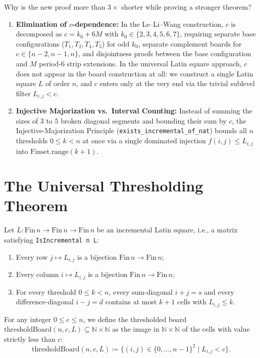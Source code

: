 \documentclass[11pt,a4paper]{article}
\theoremstyle{remark}
\begin{document}
Why is the new proof more than $3\times$ shorter while proving a stronger theorem?
\begin{enumerate}[nosep]
  \item \textbf{Elimination of $c$-dependence:} In the Le--Li--Wang construction, $c$ is decomposed as $c = k_0 + 6M$ with $k_0 \in \{2,3,4,5,6,7\}$, requiring separate base configurations ($T_1, T_2, T_4, T_5$) for odd $k_0$, separate complement boards for $c \in \{n-2, n-1, n\}$, and disjointness proofs between the base configuration and $M$ period-$6$ strip extensions. In the universal Latin square approach, $c$ does not appear in the board construction at all: we construct a single Latin square $L$ of order $n$, and $c$ enters only at the very end via the trivial sublevel filter $L_{i,j} < c$.
  \item \textbf{Injective Majorization vs.\ Interval Counting:} Instead of summing the sizes of $3$ to $5$ broken diagonal segments and bounding their sum by $c$, the Injective-Majorization Principle (\texttt{exists\_incremental\_of\_nat}) bounds all $n$ thresholds $0 \le k < n$ at once via a single dominated injection $f(i,j) \le L_{i,j}$ into $\mathrm{Finset.range}(k + 1)$.
\end{enumerate}

\section{The Universal Thresholding Theorem}

Let $L : \mathrm{Fin}\,n \to \mathrm{Fin}\,n \to \mathrm{Fin}\,n$ be an incremental Latin square, i.e., a matrix satisfying \texttt{IsIncremental n L}:
\begin{enumerate}[nosep,label=(\roman*)]
  \item Every row $j \mapsto L_{i,j}$ is a bijection $\mathrm{Fin}\,n \to \mathrm{Fin}\,n$;
  \item Every column $i \mapsto L_{i,j}$ is a bijection $\mathrm{Fin}\,n \to \mathrm{Fin}\,n$;
  \item For every threshold $0 \le k < n$, every sum-diagonal $i + j = s$ and every difference-diagonal $i - j = d$ contains at most $k + 1$ cells with $L_{i,j} \le k$.
\end{enumerate}

For any integer $0 \le c \le n$, we define the thresholded board $\mathrm{thresholdBoard}(n, c, L) \subseteq \mathbb{N} \times \mathbb{N}$ as the image in $\mathbb{N} \times \mathbb{N}$ of the cells with value strictly less than $c$:
\[
  \mathrm{thresholdBoard}(n, c, L) \coloneqq \{(i, j) \in \{0, \dots, n-1\}^2 \mid L_{i,j} < c\}.
\]
\end{document}
